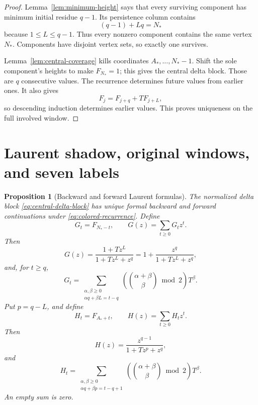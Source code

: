 \documentclass[11pt]{article}
\newtheorem{proposition}[lemma]{Proposition}
\theoremstyle{remark}
\numberwithin{equation}{section}
\begin{document}
\begin{proof}
Lemma~\ref{lem:minimum-height} says that every surviving component has minimum initial residue \(q-1\).  Its persistence column contains
\[
 (q-1)+Lq=N_\ast
\]
because \(1\leq L\leq q-1\).  Thus every nonzero component contains the same vertex \(N_\ast\).  Components have disjoint vertex sets, so exactly one survives.

Lemma~\ref{lem:central-coverage} kills coordinates \(A_\ast,\ldots,N_\ast-1\).  Shift the sole component's heights to make \(F_{N_\ast}=1\); this gives the central delta block.  Those are \(q\) consecutive values.  The recurrence determines future values from earlier ones.  It also gives
\[
 F_j=F_{j+q}+T F_{j+L},
\]
so descending induction determines earlier values.  This proves uniqueness on the full involved window.
\end{proof}


\section{Laurent shadow, original windows, and seven labels}\label{sec:laurent-shadow}

\begin{proposition}[Backward and forward Laurent formulas]\label{prop:laurent-formulas}
The normalized delta block \eqref{eq:central-delta-block} has unique formal backward and forward continuations under \eqref{eq:colored-recurrence}.  Define
\[
 G_t=F_{N_\ast-t},\qquad G(z)=\sum_{t\geq0}G_tz^t.
\]
Then
\begin{equation}\label{eq:G-function}
 G(z)=\frac{1+Tz^L}{1+Tz^L+z^q}
     =1+\frac{z^q}{1+Tz^L+z^q},
\end{equation}
and, for \(t\geq q\),
\begin{equation}\label{eq:G-coefficients}
 G_t=\sum_{\substack{\alpha,\beta\geq0\\
                     \alpha q+\beta L=t-q}}
 \left(\binom{\alpha+\beta}{\beta}\bmod2\right)T^\beta.
\end{equation}
Put \(p=q-L\), and define
\[
 H_t=F_{A_\ast+t},\qquad H(z)=\sum_{t\geq0}H_tz^t.
\]
Then
\begin{equation}\label{eq:H-function}
 H(z)=\frac{z^{q-1}}{1+Tz^p+z^q},
\end{equation}
and
\begin{equation}\label{eq:H-coefficients}
 H_t=\sum_{\substack{\alpha,\beta\geq0\\
                     \alpha q+\beta p=t-q+1}}
 \left(\binom{\alpha+\beta}{\beta}\bmod2\right)T^\beta.
\end{equation}
An empty sum is zero.
\end{proposition}
\end{document}
